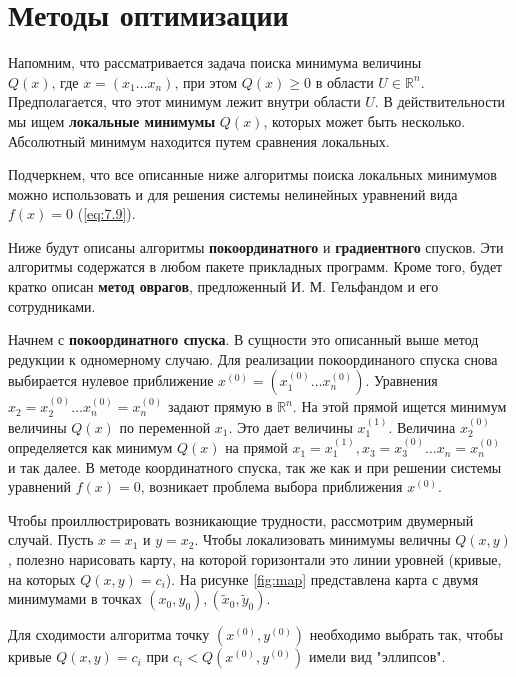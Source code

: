 \section{Методы оптимизации}

Напомним, что рассматривается задача поиска минимума величины $Q(x) \textrm{, где } x=(x_1 \dots x_n) \textrm{, при этом } Q(x) \geq 0 \textrm{ в области } U \in \mathbb{R}^n$. Предполагается, что этот минимум лежит внутри области $U$. В действительности мы ищем \textbf{локальные минимумы} $Q(x)$, которых может быть несколько. Абсолютный минимум находится путем сравнения локальных.

Подчеркнем, что все описанные ниже алгоритмы поиска локальных минимумов можно использовать и для решения системы нелинейных уравнений вида $f(x) = 0$ (\ref{eq:7.9}).

Ниже будут описаны алгоритмы \textbf{покоординатного} и \textbf{градиентного} спусков. Эти алгоритмы содержатся в любом пакете прикладных программ. Кроме того, будет кратко описан \textbf{метод оврагов}, предложенный И. М. Гельфандом и его сотрудниками.

Начнем с \textbf{покоординатного спуска}. В сущности это описанный выше метод редукции к одномерному случаю. Для реализации покоординаного спуска снова выбирается нулевое приближение $x^{(0)} = (x^{(0)}_1 \dots x^{(0)}_n)$. Уравнения $x_2 = x_2^{(0)} \dots x_n^{(0)} = x_n^{(0)}$ задают прямую в $\mathbb{R}^n$. На этой прямой ищется минимум величины $Q(x)$ по переменной $x_1$. Это дает величины $x^{(1)}_1$. Величина $x^{(0)}_2$ определяется как минимум $Q(x)$ на прямой $x_1 = x_1^{(1)}, x_3 = x_3^{(0)} \dots x_n = x_n^{(0)}$ и так далее. В методе координатного спуска, так же как и при решении системы уравнений $f(x) = 0$, возникает проблема выбора приближения $x^{(0)}$. 

Чтобы проиллюстрировать возникающие трудности, рассмотрим двумерный случай. Пусть $x = x_1 \textrm{ и } y=x_2$. Чтобы локализовать минимумы величны $Q(x, y)$, полезно нарисовать карту, на которой горизонтали это линии уровней (кривые, на которых $Q(x, y) = c_i$). На рисунке \ref{fig:map} представлена карта с двумя минимумами в точках $(x_0, y_0), (\tilde x_0, \tilde y_0)$.





Для сходимости алгоритма точку $(x^{(0)}, y^{(0)})$ необходимо выбрать так, чтобы кривые $Q(x, y) = c_i \textrm{ при } c_i < Q(x^{(0)}, y^{(0)})$ имели вид "эллипсов".

